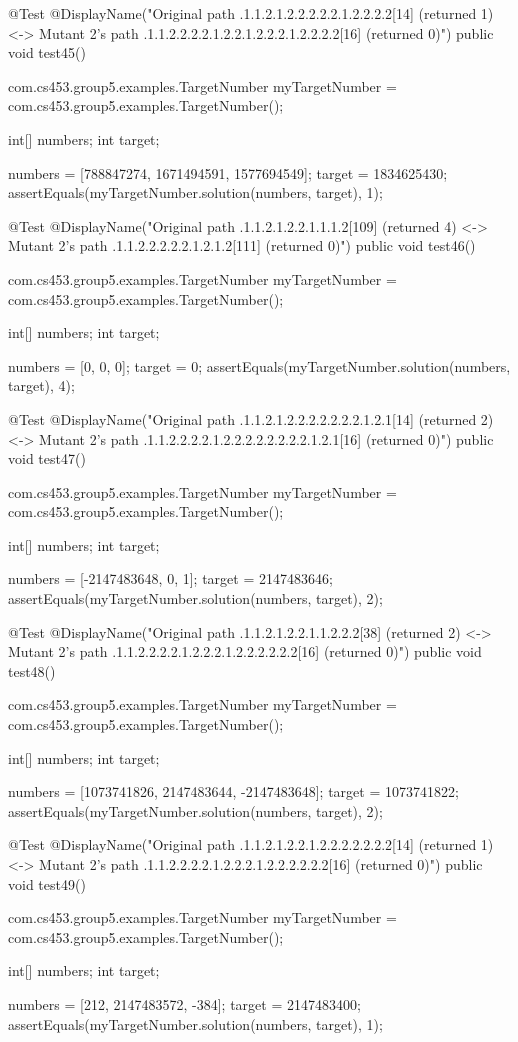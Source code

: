@Test
@DisplayName("Original path .1.1.2.1.2.2.2.2.2.1.2.2.2.2[14] (returned 1) <-> Mutant 2's path .1.1.2.2.2.2.1.2.2.1.2.2.2.1.2.2.2.2[16] (returned 0)")
public void test45() {
    com.cs453.group5.examples.TargetNumber myTargetNumber = com.cs453.group5.examples.TargetNumber();

    int[] numbers;
    int target;

    numbers = [788847274, 1671494591, 1577694549];
    target = 1834625430;
    assertEquals(myTargetNumber.solution(numbers, target), 1);
}

@Test
@DisplayName("Original path .1.1.2.1.2.2.1.1.1.2[109] (returned 4) <-> Mutant 2's path .1.1.2.2.2.2.2.1.2.1.2[111] (returned 0)")
public void test46() {
    com.cs453.group5.examples.TargetNumber myTargetNumber = com.cs453.group5.examples.TargetNumber();

    int[] numbers;
    int target;

    numbers = [0, 0, 0];
    target = 0;
    assertEquals(myTargetNumber.solution(numbers, target), 4);
}

@Test
@DisplayName("Original path .1.1.2.1.2.2.2.2.2.2.2.1.2.1[14] (returned 2) <-> Mutant 2's path .1.1.2.2.2.2.1.2.2.2.2.2.2.2.2.1.2.1[16] (returned 0)")
public void test47() {
    com.cs453.group5.examples.TargetNumber myTargetNumber = com.cs453.group5.examples.TargetNumber();

    int[] numbers;
    int target;

    numbers = [-2147483648, 0, 1];
    target = 2147483646;
    assertEquals(myTargetNumber.solution(numbers, target), 2);
}

@Test
@DisplayName("Original path .1.1.2.1.2.2.1.1.2.2.2[38] (returned 2) <-> Mutant 2's path .1.1.2.2.2.2.1.2.2.2.1.2.2.2.2.2.2[16] (returned 0)")
public void test48() {
    com.cs453.group5.examples.TargetNumber myTargetNumber = com.cs453.group5.examples.TargetNumber();

    int[] numbers;
    int target;

    numbers = [1073741826, 2147483644, -2147483648];
    target = 1073741822;
    assertEquals(myTargetNumber.solution(numbers, target), 2);
}

@Test
@DisplayName("Original path .1.1.2.1.2.2.1.2.2.2.2.2.2.2[14] (returned 1) <-> Mutant 2's path .1.1.2.2.2.2.1.2.2.2.1.2.2.2.2.2.2[16] (returned 0)")
public void test49() {
    com.cs453.group5.examples.TargetNumber myTargetNumber = com.cs453.group5.examples.TargetNumber();

    int[] numbers;
    int target;

    numbers = [212, 2147483572, -384];
    target = 2147483400;
    assertEquals(myTargetNumber.solution(numbers, target), 1);
}

